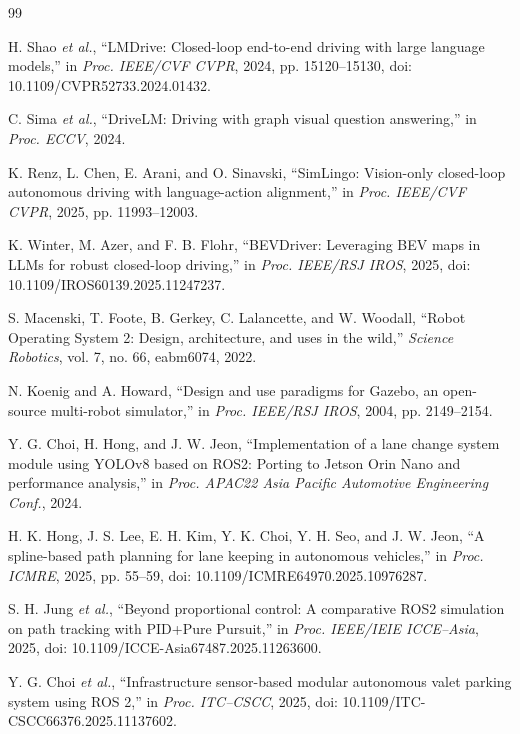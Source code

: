 \documentclass[conference]{IEEEtran}
\begin{document}
\begin{thebibliography}{99}
\setlength{\itemsep}{0pt}
\setlength{\parsep}{0pt}

H. Shao \textit{et al.}, ``LMDrive: Closed-loop end-to-end driving with large language models,'' in \textit{Proc. IEEE/CVF CVPR}, 2024, pp. 15120--15130, doi: 10.1109/CVPR52733.2024.01432.

C. Sima \textit{et al.}, ``DriveLM: Driving with graph visual question answering,'' in \textit{Proc. ECCV}, 2024.

K. Renz, L. Chen, E. Arani, and O. Sinavski, ``SimLingo: Vision-only closed-loop autonomous driving with language-action alignment,'' in \textit{Proc. IEEE/CVF CVPR}, 2025, pp. 11993--12003.

K. Winter, M. Azer, and F. B. Flohr, ``BEVDriver: Leveraging BEV maps in LLMs for robust closed-loop driving,'' in \textit{Proc. IEEE/RSJ IROS}, 2025, doi: 10.1109/IROS60139.2025.11247237.

S. Macenski, T. Foote, B. Gerkey, C. Lalancette, and W. Woodall, ``Robot Operating System 2: Design, architecture, and uses in the wild,'' \textit{Science Robotics}, vol. 7, no. 66, eabm6074, 2022.

N. Koenig and A. Howard, ``Design and use paradigms for Gazebo, an open-source multi-robot simulator,'' in \textit{Proc. IEEE/RSJ IROS}, 2004, pp. 2149--2154.

Y. G. Choi, H. Hong, and J. W. Jeon, ``Implementation of a lane change system module using YOLOv8 based on ROS2: Porting to Jetson Orin Nano and performance analysis,'' in \textit{Proc. APAC22 Asia Pacific Automotive Engineering Conf.}, 2024.

H. K. Hong, J. S. Lee, E. H. Kim, Y. K. Choi, Y. H. Seo, and J. W. Jeon, ``A spline-based path planning for lane keeping in autonomous vehicles,'' in \textit{Proc. ICMRE}, 2025, pp. 55--59, doi: 10.1109/ICMRE64970.2025.10976287.

S. H. Jung \textit{et al.}, ``Beyond proportional control: A comparative ROS2 simulation on path tracking with PID+Pure Pursuit,'' in \textit{Proc. IEEE/IEIE ICCE--Asia}, 2025, doi: 10.1109/ICCE-Asia67487.2025.11263600.

Y. G. Choi \textit{et al.}, ``Infrastructure sensor-based modular autonomous valet parking system using ROS 2,'' in \textit{Proc. ITC--CSCC}, 2025, doi: 10.1109/ITC-CSCC66376.2025.11137602.


\end{thebibliography}
\end{document}
